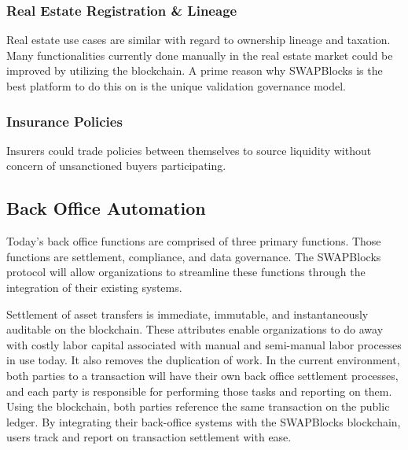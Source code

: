 \documentclass[12pt]{article}
\begin{document}
\subsubsection{Real Estate Registration \& Lineage}
Real estate use cases are similar with regard to ownership lineage and taxation. Many functionalities currently done manually in 
the real estate market could be improved by utilizing the blockchain. A prime reason why SWAPBlocks is the best platform to 
do this on is the unique validation governance model.

\subsubsection{Insurance Policies}
Insurers could trade policies between themselves to source liquidity without concern of unsanctioned buyers participating.


\subsection{Back Office Automation}
Today’s back office functions are comprised of three primary functions. Those functions are settlement, compliance, and data governance. The SWAPBlocks protocol will allow organizations to streamline these functions through the integration of their existing systems.

Settlement of asset transfers is immediate, immutable, and instantaneously auditable on the blockchain. These attributes 
enable organizations to do away with costly labor capital associated with manual and semi-manual labor processes in use 
today. It also removes the duplication of work. In the current environment, both parties to a transaction will have their 
own back office settlement processes, and each party is responsible for performing those tasks and reporting on them. 
Using the blockchain, both parties reference the same transaction on the public ledger. By integrating their back-office 
systems with the SWAPBlocks blockchain, users track and report on transaction settlement with ease.
\end{document}
